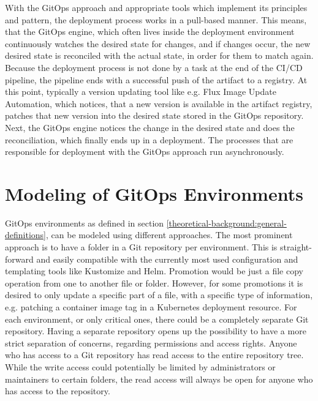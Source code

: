 With the GitOps approach and appropriate tools which implement its principles and pattern,
the deployment process works in a pull-based manner.
This means, that the GitOps engine, which often lives inside the deployment environment
continuously watches the desired state for changes,
and if changes occur, the new desired state is reconciled with the actual state, in order for them to match again.
Because the deployment process is not done by a task at the end of the CI/CD pipeline,
the pipeline ends with a successful push of the artifact to a registry.
At this point, typically a version updating tool like e.g. Flux Image Update Automation, which notices, that a new version is available in
the artifact registry, patches that new version into the desired state stored in the GitOps repository.
Next, the GitOps engine notices the change in the desired state and does the reconciliation,
which finally ends up in a deployment.
The processes that are responsible for deployment with the GitOps approach run asynchronously.








\section{Modeling of GitOps Environments}

GitOps environments as defined in section
\ref{theoretical-background:general-definitions},
can be modeled using different approaches.
The most prominent approach is to have a folder in a Git repository
per environment. This is straight-forward and easily compatible with
the currently most used configuration and templating tools like Kustomize and Helm.
Promotion would be just a file copy operation from one to another file or folder.
However, for some promotions it is desired to only update a specific part of a file,
with a specific type of information, e.g. patching a container image tag in a Kubernetes
deployment resource.
For each environment, or only critical ones, there could be a completely separate Git repository.
Having a separate repository opens up the possibility to have a more strict separation of concerns,
regarding permissions and access rights.
Anyone who has access to a Git repository has read access to the entire repository tree.
While the write access could potentially be limited by administrators or maintainers
to certain folders, the read access will always be open for anyone who has access to the repository.

